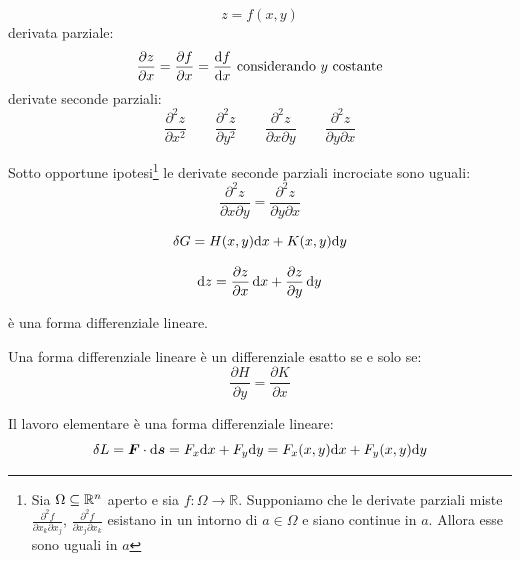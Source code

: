 \begin{equation*}z=f(x,y)\end{equation*}
derivata parziale:
\begin{equation*}\frac{\partial z}{\partial x}=\frac{\partial f}{\partial x}=\frac{\ud f}{\ud x}\ \text{considerando $y$ costante}\end{equation*}
derivate seconde parziali:
$$
\frac{\partial^2 z}{\partial x^2}\qquad \frac{\partial^2
z}{\partial y^2}\qquad \frac{\partial^2 z}{\partial x\partial
y}\qquad\frac{\partial^2 z}{\partial y\partial x}$$
\begin{Teo}[Shwartz]
Sotto opportune ipotesi\footnote{Sia $\Omega\subseteq\mathbb{R}^n$ aperto e sia $f:\Omega\to\mathbb{R}$. Supponiamo che le derivate parziali miste $\frac{\partial^2 f}{\partial x_k\partial x_j}$, $\frac{\partial^2 f}{\partial x_j\partial x_k}$ esistano in un intorno di $a\in\Omega$ e siano continue in $a$. Allora esse sono uguali in $a$} le derivate seconde parziali incrociate sono uguali:
\begin{equation*}\frac{\partial^2 z}{\partial x\partial y}=\frac{\partial^2 z}{\partial y\partial x}\end{equation*}
\end{Teo}
\begin{Def}
\begin{equation*}\delta G=H(x,y)\mathrm{d} x+K(x,y)\mathrm{d} y\end{equation*}
\end{Def}
\begin{Def}
\begin{equation*}\mathrm{d} z=\frac{\partial z}{\partial x}\,\mathrm{d} x+\frac{\partial z}{\partial y}\,\mathrm{d} y\end{equation*}
\end{Def}
è una forma differenziale lineare.
\begin{Teo}
 Una forma differenziale lineare è un differenziale esatto se e
solo se:
\begin{equation*}\frac{\partial H}{\partial y}=\frac{\partial K}{\partial x}\end{equation*}
\end{Teo}
Il lavoro elementare è una forma differenziale lineare:
\begin{equation*}\delta L=\boldsymbol{F}\cdot \mathrm{d} \boldsymbol{s}=F_x\mathrm{d} x+F_y\mathrm{d} y=F_x(x,y)\mathrm{d} x+F_y(x,y)\mathrm{d} y\end{equation*}
